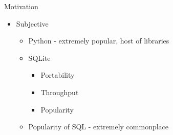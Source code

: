 \documentclass[handout, xcolor={dvipsnames}]{beamer}
\begin{document}
\begin{frame}{Motivation}{}
  \begin{itemize}
  \item<1-> {
   Subjective
   \begin{itemize}
       \item<1->  Python - extremely popular, host of libraries
       \vspace{.2in}
       \item<2-> SQLite
        \begin{itemize}
            \item<3-> Portability 
            \item<4-> Throughput
            \item<5-> Popularity
        \end{itemize}
        \vspace{.2in}
       \item<6-> Popularity of SQL - extremely commonplace
       \begin{figure}
           \centering

\end{figure}
\end{itemize}}
\end{itemize}
\end{frame}
\end{document}
